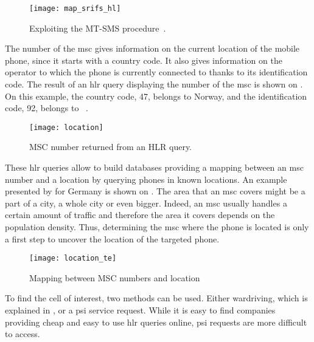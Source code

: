       \begin{figure}[h]
        \centering
        \texttt{[image: map\_srifs\_hl]}
        \caption{Exploiting the MT-SMS
      procedure~\cite[p.~792]{3gpp_ts_2015-2}.}
        \label{fig:map_srifs_hl}
      \end{figure}

      The number of the \gls{msc} gives information on the current
      location of the mobile phone, since it starts with a country code.
      It also gives information on the operator to which the phone is
      currently connected to thanks to its identification code. The
      result of an \gls{hlr} query displaying the number of the
      \gls{msc} is shown on . On this example, the
      country code, 47, belongs to Norway, and the identification code,
      92, belongs to ~\cite{nkom}.

      \begin{figure}[h]
        \centering
        \texttt{[image: location]}
        \caption{MSC number returned from an HLR query.}
        \label{fig:location}
      \end{figure}
      
      These \gls{hlr} queries allow to build databases providing a
      mapping between an \gls{msc} number and a location by querying
      phones in known locations. An example presented by
       for Germany is shown on
      . The area that an \gls{msc} covers might be
      a part of a city, a whole city or even bigger. Indeed, an
      \gls{msc} usually handles a certain amount of traffic and
      therefore the area it covers depends on the population density.
      Thus, determining the \gls{msc} where the phone is located is only
      a first step to uncover the location of the targeted phone.

      \begin{figure}[h]
        \centering
        \texttt{[image: location\_te]}
        \caption{Mapping between MSC numbers and
        location~\cite{engel_locating_2008}}
        \label{fig:location_te}
      \end{figure}

      To find the cell of interest, two methods can be used. Either
      wardriving, which is explained in ,
      or a \gls{psi} service request. While it is easy to find companies
      providing cheap and easy to use \gls{hlr} queries online,
      \gls{psi} requests are more difficult to access.

